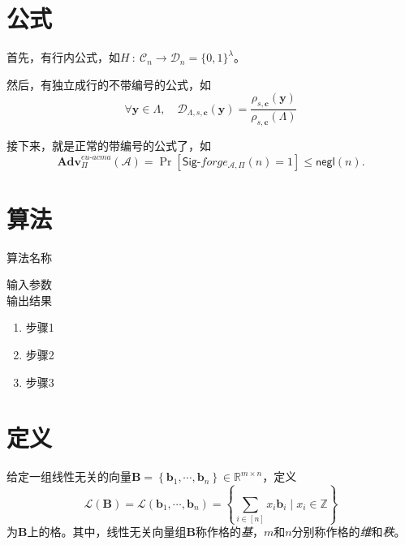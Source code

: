\section{公式}

首先，有行内公式，如$H~:~\mathcal{C}_n \rightarrow \mathcal{D}_n = \{0,1\}^\lambda$。

然后，有独立成行的不带编号的公式，如
$$
\forall\mathbf{y}\in\Lambda,\quad\mathcal{D}_{\Lambda,s,\mathbf{c}}(\mathbf{y})=\frac{\rho_{s,\mathbf{c}}(\mathbf{y})}{\rho_{s,\mathbf{c}}(\Lambda)}
$$

接下来，就是正常的带编号的公式了，如
\begin{equation}
  \mathbf{Adv}^{eu\mbox{-}acma}_{\Pi}(\mathcal{A}) =  \Pr \left[\mathsf{Sig}\mbox{-}forge_{\mathcal{A},\Pi}(n) = 1 \right] \leq \mathsf{negl}(n).
\end{equation}


\section{算法}

\begin{algorithm}
  \caption{算法名称}
\label{alg:alg}
  \algorithmicrequire 输入参数 \\
  \algorithmicensure 输出结果
  \begin{enumerate}
    \item 步骤1
    \item 步骤2
    \item 步骤3
  \end{enumerate}
\end{algorithm}


\section{定义}

\begin{definition}[格]
\label{def:lattice}
给定一组线性无关的向量$\mathbf{B}=\left\{\mathbf{b}_1,\cdots,\mathbf{b}_n\right\}\in\mathbb{R}^{m\times n}$，定义
\begin{equation}
\mathcal{L}(\mathbf{B})=\mathcal{L}(\mathbf{b}_1,\cdots,\mathbf{b}_n)=\left\{\sum_{i\in[n]}x_i\mathbf{b}_i\mid x_i\in\mathbb{Z}\right\}
\end{equation}
为$\mathbf{B}$上的格。其中，线性无关向量组$\mathbf{B}$称作格的\textit{基}，$m$和$n$分别称作格的\textit{维}和\textit{秩}。
\end{definition}

